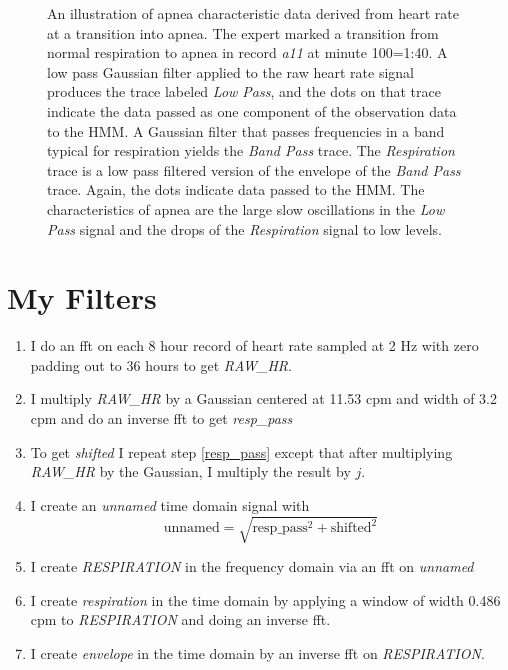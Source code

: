 \documentclass[twocolumn]{article}
\begin{document}
\begin{figure}
  \caption[Apnea characteristics derived from estimated heart rate
  signal.]{An illustration of apnea characteristic data derived from
    heart rate at a transition into apnea.  The expert marked a
    transition from normal respiration to apnea in record \emph{a11}
    at minute 100=1:40.  A low pass Gaussian filter applied to the raw
    heart rate signal produces the trace labeled \emph{Low Pass}, and
    the dots on that trace indicate the data passed as one component
    of the observation data to the HMM.  A Gaussian filter that passes
    frequencies in a band typical for respiration yields the
    \emph{Band Pass} trace.  The \emph{Respiration} trace is a low
    pass filtered version of the envelope of the \emph{Band Pass}
    trace.  Again, the dots indicate data passed to the HMM.  The
    characteristics of apnea are the large slow oscillations in the
    \emph{Low Pass} signal and the drops of the \emph{Respiration}
    signal to low levels.}
  \label{fig:explore}
\end{figure}

\section{My Filters}
\label{sec:filters}

\begin{enumerate}
\item I do an fft on each 8 hour record of heart rate sampled at 2 Hz
  with zero padding out to 36 hours to get \emph{RAW\_HR}.
\item \label{resp_pass} I multiply \emph{RAW\_HR} by a Gaussian
  centered at 11.53 cpm and width of 3.2 cpm and do an inverse fft to
  get \emph{resp\_pass}
\item To get \emph{shifted} I repeat step \ref{resp_pass} except that
  after multiplying \emph{RAW\_HR} by the Gaussian, I multiply the
  result by $j$.
\item I create an \emph{unnamed} time domain signal with
  \begin{equation}
    \label{eq:unnamed}
    \text{unnamed} = \sqrt{\text{resp\_pass}^2 + \text{shifted}^2}
  \end{equation}
\item I create \emph{RESPIRATION} in the frequency domain via an fft
  on \emph{unnamed}
\item I create \emph{respiration} in the time domain by applying a
  window of width 0.486 cpm to \emph{RESPIRATION} and doing an inverse fft.
\item I create \emph{envelope} in the time domain by an inverse fft on
  \emph{RESPIRATION}.
\end{enumerate}
\end{document}
